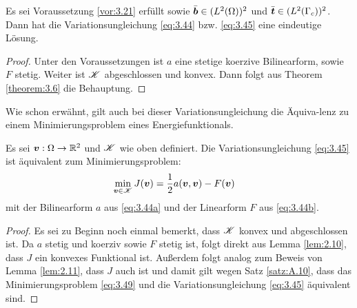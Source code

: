 \begin{theorem}\label{theorem:3.22}
Es sei Voraussetzung \ref{vor:3.21} erfüllt sowie $\bar{\boldsymbol b}  \in (L^2(\Omega))^2$ und $\bar{\boldsymbol t} \in (L^2(\Gamma_c))^2$. Dann hat die Variationsungleichung \eqref{eq:3.44} bzw. \eqref{eq:3.45} eine eindeutige Lösung.
\end{theorem}

\begin{proof}
Unter den Voraussetzungen ist $a$ eine stetige koerzive Bilinearform, sowie $F$ stetig. Weiter ist $\mathscr K$ abgeschlossen und konvex. Dann folgt aus Theorem \ref{theorem:3.6} die Behauptung.
\end{proof}


Wie schon erwähnt, gilt auch bei dieser Variationsungleichung die Äquiva-lenz zu einem Minimierungsproblem eines Energiefunktionals. 


\begin{theorem}\label{theorem:3.23}
Es sei $\boldsymbol v : \Omega \rightarrow \mathbb{R}^2$ und $\mathscr K$ wie oben definiert. Die Variationsungleichung \eqref{eq:3.45} ist äquivalent zum Minimierungsproblem:
\begin{align}\label{eq:3.49}
	\min_{\boldsymbol v \in \mathscr K} J(\boldsymbol v)& = \frac 1 2 a(\boldsymbol v, \boldsymbol v)-F(\boldsymbol v)
\end{align}
mit der Bilinearform $a$ aus \eqref{eq:3.44a} und der Linearform $F$ aus \eqref{eq:3.44b}.
\end{theorem}

\begin{proof}
Es sei zu Beginn noch einmal bemerkt, dass $\mathscr K$ konvex und abgeschlossen ist. Da $a$ stetig und koerziv sowie $F$ stetig ist, folgt direkt aus Lemma \ref{lem:2.10}, dass $J$ ein konvexes Funktional ist. Außerdem folgt analog zum Beweis von Lemma \ref{lem:2.11}, dass $J$ auch  ist und damit gilt wegen Satz \ref{satz:A.10}, dass das Minimierungsproblem \eqref{eq:3.49} und die Variationsungleichung \eqref{eq:3.45} äquivalent sind.
\end{proof}



